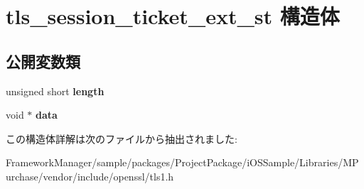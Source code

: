 \hypertarget{structtls__session__ticket__ext__st}{}\section{tls\+\_\+session\+\_\+ticket\+\_\+ext\+\_\+st 構造体}
\label{structtls__session__ticket__ext__st}
\subsection*{公開変数類}
\begin{DoxyCompactItemize}
\item 
\hypertarget{structtls__session__ticket__ext__st_ab4a3be707090c71d78abec6456b8a3a9}{}unsigned short {\bfseries length}\label{structtls__session__ticket__ext__st_ab4a3be707090c71d78abec6456b8a3a9}

\item 
\hypertarget{structtls__session__ticket__ext__st_a06405cfdcffe766026c389d9499602a9}{}void $\ast$ {\bfseries data}\label{structtls__session__ticket__ext__st_a06405cfdcffe766026c389d9499602a9}

\end{DoxyCompactItemize}


この構造体詳解は次のファイルから抽出されました\+:\begin{DoxyCompactItemize}
\item 
Framework\+Manager/sample/packages/\+Project\+Package/i\+O\+S\+Sample/\+Libraries/\+M\+Purchase/vendor/include/openssl/tls1.\+h\end{DoxyCompactItemize}

